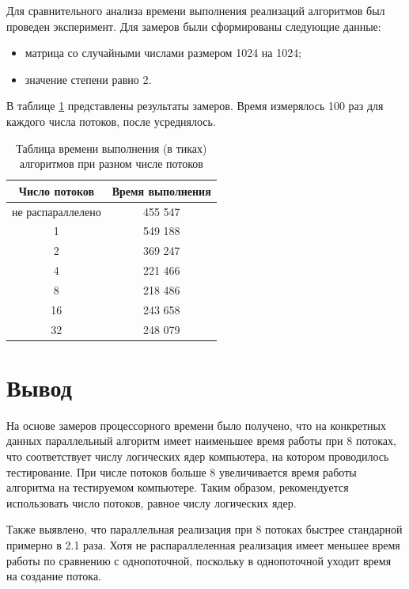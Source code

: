 \documentclass[12pt]{report}
\begin{document}
Для сравнительного анализа времени выполнения реализаций алгоритмов был проведен эксперимент. Для замеров были сформированы следующие данные:
\begin{itemize}
	\item матрица со случайными числами размером 1024 на 1024;
	\item значение степени равно 2.
\end{itemize}

В таблице \ref{time} представлены результаты замеров. Время измерялось 100 раз для каждого числа потоков, после усреднялось. 

\begin{table} [H]
	\label{time}
	\caption{Таблица времени выполнения (в тиках) алгоритмов при разном числе потоков}
	\begin{center}
		\begin{tabular}{|c c|} 
			\hline
			Число потоков & Время выполнения \\  
			\hline
			не распараллелено & 455 547 \\
			\hline
			1 & 549 188 \\
			\hline
			2 & 369 247 \\
			\hline
			4 & 221 466 \\
			\hline
			8 & 218 486 \\
			\hline
			16 & 243 658 \\
			\hline
			32 & 248 079 \\
			\hline
		\end{tabular}
	\end{center}
\end{table}

\section{Вывод}

На основе замеров процессорного времени было получено, что на конкретных данных параллельный алгоритм имеет наименьшее время работы при 8 потоках, что соответствует числу логических ядер компьютера, на котором проводилось тестирование. При числе потоков больше 8 увеличивается время работы алгоритма на тестируемом компьютере. Таким образом, рекомендуется использовать число потоков, равное числу логических ядер.

Также выявлено, что параллельная реализация при 8 потоках быстрее стандарной примерно в 2.1 раза. Хотя не распараллеленная реализация имеет меньшее время работы по сравнению с однопоточной, поскольку в однопоточной уходит время на создание потока.
\end{document}
